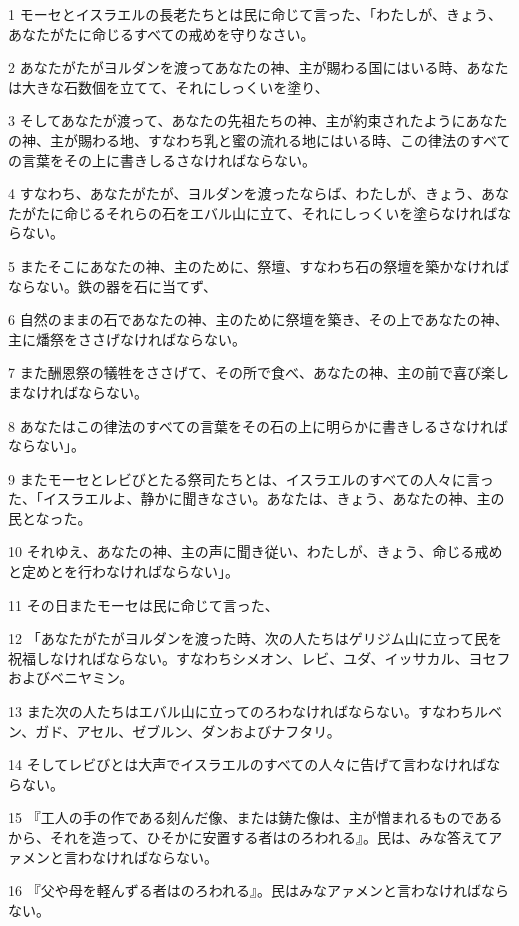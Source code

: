 \par 1 モーセとイスラエルの長老たちとは民に命じて言った、「わたしが、きょう、あなたがたに命じるすべての戒めを守りなさい。
\par 2 あなたがたがヨルダンを渡ってあなたの神、主が賜わる国にはいる時、あなたは大きな石数個を立てて、それにしっくいを塗り、
\par 3 そしてあなたが渡って、あなたの先祖たちの神、主が約束されたようにあなたの神、主が賜わる地、すなわち乳と蜜の流れる地にはいる時、この律法のすべての言葉をその上に書きしるさなければならない。
\par 4 すなわち、あなたがたが、ヨルダンを渡ったならば、わたしが、きょう、あなたがたに命じるそれらの石をエバル山に立て、それにしっくいを塗らなければならない。
\par 5 またそこにあなたの神、主のために、祭壇、すなわち石の祭壇を築かなければならない。鉄の器を石に当てず、
\par 6 自然のままの石であなたの神、主のために祭壇を築き、その上であなたの神、主に燔祭をささげなければならない。
\par 7 また酬恩祭の犠牲をささげて、その所で食べ、あなたの神、主の前で喜び楽しまなければならない。
\par 8 あなたはこの律法のすべての言葉をその石の上に明らかに書きしるさなければならない」。
\par 9 またモーセとレビびとたる祭司たちとは、イスラエルのすべての人々に言った、「イスラエルよ、静かに聞きなさい。あなたは、きょう、あなたの神、主の民となった。
\par 10 それゆえ、あなたの神、主の声に聞き従い、わたしが、きょう、命じる戒めと定めとを行わなければならない」。
\par 11 その日またモーセは民に命じて言った、
\par 12 「あなたがたがヨルダンを渡った時、次の人たちはゲリジム山に立って民を祝福しなければならない。すなわちシメオン、レビ、ユダ、イッサカル、ヨセフおよびベニヤミン。
\par 13 また次の人たちはエバル山に立ってのろわなければならない。すなわちルベン、ガド、アセル、ゼブルン、ダンおよびナフタリ。
\par 14 そしてレビびとは大声でイスラエルのすべての人々に告げて言わなければならない。
\par 15 『工人の手の作である刻んだ像、または鋳た像は、主が憎まれるものであるから、それを造って、ひそかに安置する者はのろわれる』。民は、みな答えてアァメンと言わなければならない。
\par 16 『父や母を軽んずる者はのろわれる』。民はみなアァメンと言わなければならない。
